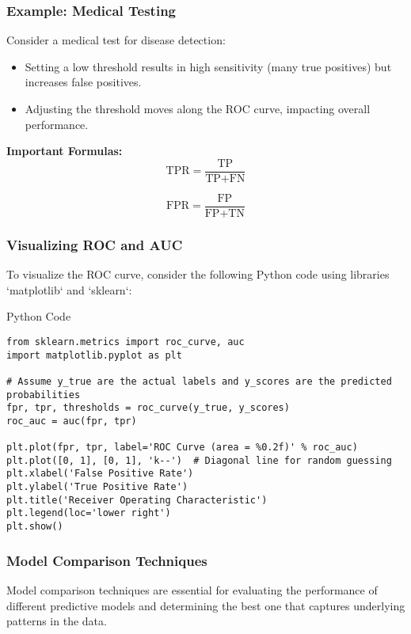 \documentclass[aspectratio=169]{beamer}
\begin{document}
\begin{frame}[fragile]
  \frametitle{Example: Medical Testing}
  Consider a medical test for disease detection:
  \begin{itemize}
    \item Setting a low threshold results in high sensitivity (many true positives) but increases false positives.
    \item Adjusting the threshold moves along the ROC curve, impacting overall performance.
  \end{itemize}

  \textbf{Important Formulas:}
  \begin{equation}
  \text{TPR} = \frac{\text{TP}}{\text{TP} + \text{FN}}
  \end{equation}
  
  \begin{equation}
  \text{FPR} = \frac{\text{FP}}{\text{FP} + \text{TN}}
  \end{equation}
\end{frame}

\begin{frame}[fragile]
  \frametitle{Visualizing ROC and AUC}
  To visualize the ROC curve, consider the following Python code using libraries `matplotlib` and `sklearn`:
  \begin{block}{Python Code}
    \begin{lstlisting}
from sklearn.metrics import roc_curve, auc
import matplotlib.pyplot as plt

# Assume y_true are the actual labels and y_scores are the predicted probabilities
fpr, tpr, thresholds = roc_curve(y_true, y_scores)
roc_auc = auc(fpr, tpr)

plt.plot(fpr, tpr, label='ROC Curve (area = %0.2f)' % roc_auc)
plt.plot([0, 1], [0, 1], 'k--')  # Diagonal line for random guessing
plt.xlabel('False Positive Rate')
plt.ylabel('True Positive Rate')
plt.title('Receiver Operating Characteristic')
plt.legend(loc='lower right')
plt.show()
    \end{lstlisting}
  \end{block}
\end{frame}

\begin{frame}[fragile]
  \frametitle{Model Comparison Techniques}
  Model comparison techniques are essential for evaluating the performance of different predictive models and determining the best one that captures underlying patterns in the data.
\end{frame}
\end{document}
